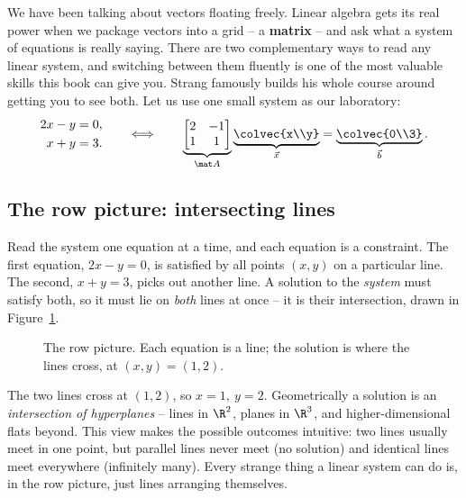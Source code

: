 We have been talking about vectors floating freely. Linear algebra gets its real power when we package
vectors into a grid -- a \textbf{matrix} -- and ask what a system of equations is really saying. There
are two complementary ways to read any linear system, and switching between them fluently is one of
the most valuable skills this book can give you. Strang famously builds his whole course around getting
you to see both. Let us use one small system as our laboratory:
\[
\begin{aligned}
2x - y &= 0,\\
x + y &= 3.
\end{aligned}
\qquad\Longleftrightarrow\qquad
\underbrace{\begin{bmatrix} 2 & -1 \\ 1 & 1 \end{bmatrix}}_{\mat A}
\underbrace{\colvec{x\\y}}_{\vec x}
=
\underbrace{\colvec{0\\3}}_{\vec b}.
\]

\subsection{The row picture: intersecting lines}

Read the system one equation at a time, and each equation is a constraint. The first equation,
$2x - y = 0$, is satisfied by all points $(x,y)$ on a particular line. The second, $x + y = 3$, picks
out another line. A solution to the \emph{system} must satisfy both, so it must lie on \emph{both}
lines at once -- it is their intersection, drawn in Figure~\ref{ch01:rowpic}.

\begin{figure}[H]
\centering
{}
\caption{The row picture. Each equation is a line; the solution is where the lines cross, at
$(x,y)=(1,2)$.}
\label{ch01:rowpic}
\end{figure}

The two lines cross at $(1,2)$, so $x=1,\ y=2$. Geometrically a solution is an \emph{intersection of
hyperplanes} -- lines in $\R^2$, planes in $\R^3$, and higher-dimensional flats beyond. This view makes
the possible outcomes intuitive: two lines usually meet in one point, but parallel lines never meet
(no solution) and identical lines meet everywhere (infinitely many). Every strange thing a linear
system can do is, in the row picture, just lines arranging themselves.

